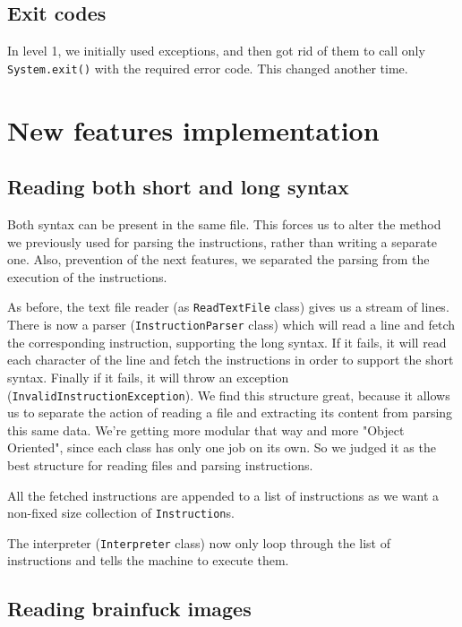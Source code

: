 \documentclass{article}
\begin{document}
\subsection{Exit codes}

In level 1, we initially used exceptions, and then got rid of them to call only \texttt{System.exit()} with the required error code. This changed another time.

\section{New features implementation}

\subsection{Reading both short and long syntax}

Both syntax can be present in the same file. This forces us to alter the method we previously used for parsing the instructions, rather than writing a separate one. Also, prevention of the next features, we separated the parsing from the execution of the instructions.

As before, the text file reader (as \texttt{ReadTextFile} class) gives us a stream of lines. There is now a parser (\texttt{InstructionParser} class) which will read a line and fetch the corresponding instruction, supporting the long syntax. If it fails, it will read each character of the line and fetch the instructions in order to support the short syntax. Finally if it fails, it will throw an exception (\texttt{InvalidInstructionException}). We find this structure great, because it allows us to separate the action of reading a file and extracting its content from parsing this same data. We're getting more modular that way and more "Object Oriented", since each class has only one job on its own. So we judged it as the best structure for reading files and parsing instructions.

All the fetched instructions are appended to a list of instructions as we want a non-fixed size collection of \texttt{Instruction}s.

The interpreter (\texttt{Interpreter} class) now only loop through the list of instructions and tells the machine to execute them.

\subsection{Reading brainfuck images}
\end{document}

